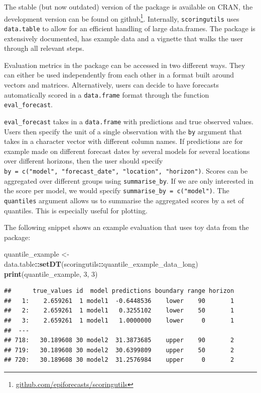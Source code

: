 \documentclass[
]{book}
\newenvironment{Shaded}{\begin{snugshade}}{\end{snugshade}}
\newcommand{\DecValTok}[1]{\textcolor[rgb]{0.00,0.00,0.81}{#1}}
\newcommand{\KeywordTok}[1]{\textcolor[rgb]{0.13,0.29,0.53}{\textbf{#1}}}
\newcommand{\NormalTok}[1]{#1}
\newcommand{\OperatorTok}[1]{\textcolor[rgb]{0.81,0.36,0.00}{\textbf{#1}}}
\newcommand{\StringTok}[1]{\textcolor[rgb]{0.31,0.60,0.02}{#1}}
\begin{document}
The stable (but now outdated) version of the package is available on CRAN, the development version can be found on github\footnote{\href{https://github.com/epiforecasts/scoringutils}{github.com/epiforecasts/scoringutils}}. Internally, \texttt{scoringutils} uses \texttt{data.table} to allow for an efficient handling of large data.frames. The package is extensively documented, has example data and a vignette that walks the user through all relevant steps.

Evaluation metrics in the package can be accessed in two different ways. They can either be used independently from each other in a format built around vectors and matrices. Alternatively, users can decide to have forecasts automatically scored in a \texttt{data.frame} format through the function \texttt{eval\_forecast}.

\texttt{eval\_forecast} takes in a \texttt{data.frame} with predictions and true observed values. Users then specify the unit of a single observation with the \texttt{by} argument that takes in a character vector with different column names. If predictions are for example made on different forecast dates by several models for several locations over different horizons, then the user should specify \texttt{by\ =\ c("model",\ "forecast\_date",\ "location",\ "horizon")}. Scores can be aggregated over different groups using \texttt{summarise\_by}. If we are only interested in the score per model, we would specify \texttt{summarise\_by\ =\ c("model")}. The \texttt{quantiles} argument allows us to summarise the aggregated scores by a set of quantiles. This is especially useful for plotting.

The following snippet shows an example evaluation that uses toy data from the package:

\begin{Shaded}
\begin{Highlighting}[]
\NormalTok{quantile\_example \textless{}{-}}\StringTok{ }\NormalTok{data.table}\OperatorTok{::}\KeywordTok{setDT}\NormalTok{(scoringutils}\OperatorTok{::}\NormalTok{quantile\_example\_data\_long)}
\KeywordTok{print}\NormalTok{(quantile\_example, }\DecValTok{3}\NormalTok{, }\DecValTok{3}\NormalTok{)}
\end{Highlighting}
\end{Shaded}

\begin{verbatim}
##      true_values id  model predictions boundary range horizon
##   1:    2.659261  1 model1  -0.6448536    lower    90       1
##   2:    2.659261  1 model1   0.3255102    lower    50       1
##   3:    2.659261  1 model1   1.0000000    lower     0       1
##  ---                                                         
## 718:   30.189608 30 model2  31.3873685    upper    90       2
## 719:   30.189608 30 model2  30.6399809    upper    50       2
## 720:   30.189608 30 model2  31.2576984    upper     0       2
\end{verbatim}
\end{document}
